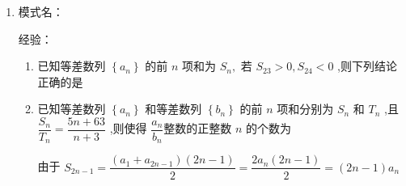 \begin{enumerate}
    经验：

    \begin{enumerate}
        \item 若等差数列$\{a_n\}$中$a_3 + a_{11} = 10$，则$a_2 + a_4 + a_{15} = $
        \begin{jieda}
            $a_3 + a_{11} = 2a_7$，故$a_7 = 5$，而$a_2 + a_4 + a_{15} = 3a_7 = 15$.
        \end{jieda}
        \item 若一个等差数列共有$2n+1$项，其奇数项之和为$290$，偶数项之和为$261$，则第$n+1$项为
        \begin{jieda}
            $290 = (n+1)a_{n+1}$，$261 = na_{n+1}$，故$a_{n+1} = 290 - 261 = 29$.
        \end{jieda}
            
        \item 若等差数列$\{a_n\}$中，$a_1 + a_2 + \cdots + a_9 = a$，$a_{n-8} + a_{n-7} + \cdots + a_n = b$，则$\{a_n\}$的前$n$项和为
        \begin{jieda}
            $a+b = a_1 + a_2 + \cdots + a_9 + a_{n-8} + a_{n-7} + \cdots + a_n = 10(a_1 + a_n)$，故$S_n = \dfrac{a+b}{9} \times \dfrac{n}{2} = \dfrac{n(a+b)}{18}$
        \end{jieda}
    \end{enumerate}

    
    \item 模式名：
    
    经验：

    \begin{enumerate}
        \item 已知等差数列 $\left\{  {a}_{n}\right\}$ 的前 $n$ 项和为 ${S}_{n},$ 若 ${S}_{23} > 0,{S}_{24} < 0$ ,则下列结论正确的是 
        \item 已知等差数列 $\left\{  {a}_{n}\right\}$ 和等差数列 $\left\{  {b}_{n}\right\}$ 的前 $n$ 项和分别为 ${S}_{n}$ 和 ${T}_{n}$ ,且 $\dfrac{{S}_{n}}{T_n} = \dfrac{{5n} + {63}}{n + 3}$ ,则使得 $\dfrac{a_n}{b_n}$整数的正整数 $n$ 的个数为 
        \begin{jieda}
            由于 ${S}_{{2n} - 1} = \dfrac{\left( {{a}_{1} + {a}_{{2n} - 1}}\right) \left( {{2n} - 1}\right) }{2} = \dfrac{2{a}_{n}\left( {{2n} - 1}\right) }{2} = \left( {{2n} - 1}\right) {a}_{n}$
            

\end{jieda}
\end{enumerate}
\end{enumerate}
